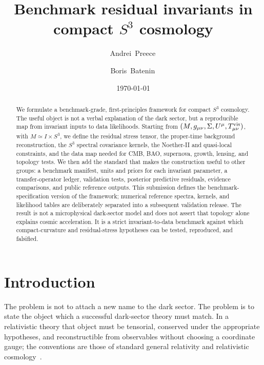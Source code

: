 \documentclass[
  aps,
  prd,
  reprint,
  superscriptaddress,
  nofootinbib,
  floatfix,
  longbibliography
]{revtex4-2}
\begin{document}
\title{Benchmark residual invariants in compact \texorpdfstring{\(S^3\)}{S3} cosmology}

\author{Andrei~Preece\,}

\author{Boris~Batenin\,}

\date{\today}

\begin{abstract}
We formulate a benchmark-grade, first-principles framework for compact
\(S^3\) cosmology.  The useful object is not a verbal explanation of the
dark sector, but a reproducible map from invariant inputs to data
likelihoods.  Starting from
\((M,g_{\mu\nu},\Sigma,U^\mu,T^{\rm vis}_{\mu\nu})\), with
\(M\simeq I\times S^3\), we define the residual stress tensor,
the proper-time background reconstruction, the \(S^3\) spectral
covariance kernels, the Noether-II and quasi-local constraints, and the
data map needed for CMB, BAO, supernova, growth, lensing, and topology
tests.  We then add the standard that makes the construction useful to
other groups: a benchmark manifest, units and priors for each invariant
parameter, a transfer-operator ledger, validation tests, posterior
predictive residuals, evidence comparisons, and public reference
outputs.  This submission defines the benchmark-specification version of
the framework; numerical reference spectra, kernels, and likelihood
tables are deliberately separated into a subsequent validation release.
The result is not a microphysical dark-sector model and does not assert
that topology alone explains cosmic acceleration.  It is a strict
invariant-to-data benchmark against which compact-curvature and
residual-stress hypotheses can be tested, reproduced, and falsified.
\end{abstract}

\maketitle

\section{Introduction}
\label{sec:introduction}

The problem is not to attach a new name to the dark sector.  The problem
is to state the object which a successful dark-sector theory must match.
In a relativistic theory that object must be tensorial, conserved under
the appropriate hypotheses, and reconstructible from observables without
choosing a coordinate gauge; the conventions are those of standard general relativity and relativistic cosmology~\cite{Wald1984,HawkingEllis1973,Peebles1993,DodelsonSchmidt2020,Weinberg2008}.
\end{document}
